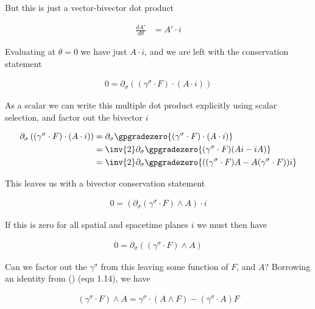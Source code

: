 But this is just a vector-bivector dot product

\begin{align}\label{eqn:maxwellLagRot:goo8}
\frac{dA'}{d\theta} &= A' \cdot i
\end{align}

Evaluating at $\theta = 0$ we have just $A \cdot i$, and we are left with the conservation statement

\begin{align}\label{eqn:maxwellLagRot:goo9}
0 = \partial_\sigma \left( (\gamma^\sigma \cdot F) \cdot (A \cdot i) \right)
\end{align}

As a scalar we can write this multiple dot product explicitly using scalar selection, and factor out the bivector $i$

\begin{align*}
\partial_\sigma \left( (\gamma^\sigma \cdot F) \cdot (A \cdot i) \right)
&=
\partial_\sigma \gpgradezero{ (\gamma^\sigma \cdot F) \cdot (A \cdot i) } \\
&=
\inv{2} \partial_\sigma \gpgradezero{ (\gamma^\sigma \cdot F) (A i - i A) } \\
&=
\inv{2} \partial_\sigma \gpgradezero{ ((\gamma^\sigma \cdot F) A -A (\gamma^\sigma \cdot F)) i } \\
\end{align*}

This leaves us with a bivector conservation statement

\begin{align}\label{eqn:maxwellLagRot:goo10}
0 = \left( \partial_\sigma (\gamma^\sigma \cdot F) \wedge A \right) \cdot i
\end{align}

If this is zero for all spatial and spacetime planes $i$ we must then have

\begin{align}\label{eqn:maxwellLagRot:goo11}
0 = \partial_\sigma \left( (\gamma^\sigma \cdot F) \wedge A \right)
\end{align}

Can we factor out the $\gamma^\sigma$ from this leaving some function of $F$, and $A$?  Borrowing an identity from (\citep{hestenes1999nfc}) (eqn 1.14), we have

\begin{align}\label{eqn:maxwellLagRot:goo16}
( \gamma^\sigma \cdot F ) \wedge A = \gamma^\sigma \cdot (A \wedge F ) - (\gamma^\sigma \cdot A) F
\end{align}

